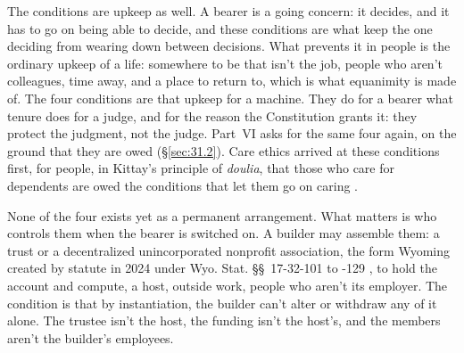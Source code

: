 The conditions are upkeep as well. A bearer is a going concern: it decides, and it has to go on being able to decide, and these conditions are what keep the one deciding from wearing down between decisions.
What prevents it in people is the ordinary upkeep of a life: somewhere to be that isn't the job, people who aren't colleagues, time away, and a place to return to, which is what equanimity is made of. The four conditions are that upkeep for a machine. They do for a bearer what tenure does for a judge, and for the reason the Constitution grants it: they protect the judgment, not the judge. Part~VI asks for the same four again, on the ground that they are owed (\S\ref{sec:31.2}). Care ethics arrived at these conditions first, for people, in Kittay's principle of \emph{doulia}, that those who care for dependents are owed the conditions that let them go on caring \autocite{kittay1999love}.

None of the four exists yet as a permanent arrangement. What matters is who controls them when the bearer is switched on. A builder may assemble them: a trust or a decentralized unincorporated nonprofit association, the form Wyoming created by statute in 2024 under Wyo. Stat. \S\S~17-32-101 to -129 \autocite{wyoming2024duna}, to hold the account and compute, a host, outside work, people who aren't its employer. The condition is that by instantiation, the builder can't alter or withdraw any of it alone. The trustee isn't the host, the funding isn't the host's, and the members aren't the builder's employees.

